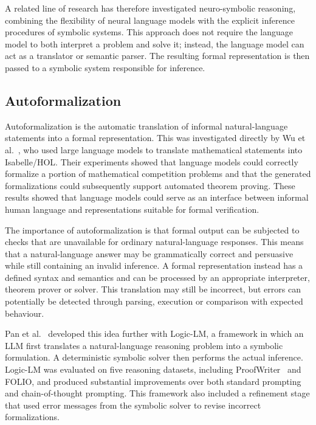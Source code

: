 \documentclass[11pt]{article} %
\theoremstyle{plain}
\theoremstyle{definition}
\begin{document}
A related line of research has therefore investigated neuro-symbolic reasoning,
combining the flexibility of neural language models with the explicit inference
procedures of symbolic systems. This approach does not require the language
model to both interpret a problem and solve it; instead, the language model can
act as a translator or semantic parser. The resulting formal representation is
then passed to a symbolic system responsible for inference.


\subsection{Autoformalization}

Autoformalization is the automatic translation of informal natural-language
statements into a formal representation. This was investigated directly by
Wu et al.~\cite{wu2022autoformalization}, who used large language models to
translate mathematical statements into Isabelle/HOL. Their experiments showed that language models
could correctly formalize a portion of mathematical competition problems and
that the generated formalizations could subsequently support automated theorem
proving. These results showed that language models could serve as an interface
between informal human language and representations suitable for formal verification.

The importance of autoformalization is that formal output can be subjected to
checks that are unavailable for ordinary natural-language responses. This means
that a natural-language answer may be grammatically correct and persuasive
while still containing an invalid inference. A formal representation instead
has a defined syntax and semantics and can be processed by an appropriate
interpreter, theorem prover or solver. This translation may still be incorrect,
but errors can potentially be detected through parsing, execution or comparison
with expected behaviour.

Pan et al.~\cite{pan2023logiclm} developed this idea further with Logic-LM, a
framework in which an LLM first translates a natural-language reasoning problem
into a symbolic formulation. A deterministic symbolic solver then performs the actual
inference. Logic-LM was evaluated on five reasoning datasets, including
ProofWriter~\cite{tafjord2021proofwriter} and FOLIO, and produced substantial
improvements over both standard prompting and chain-of-thought prompting. This
framework also included a refinement stage that used error messages from the
symbolic solver to revise incorrect formalizations.
\end{document}
